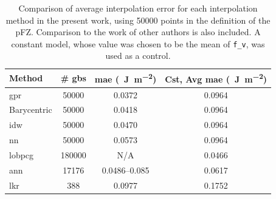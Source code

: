 \documentclass[preprint,12pt]{elsarticle}
\begin{document}
\begin{table}
\caption{Comparison of average interpolation error for each interpolation method in the present work, using \num{50000} points in the definition of the pFZ. Comparison to the work of other authors is also included. A constant model, whose value was chosen to be the mean of \texttt{f\_v}, was used as a control.}
\centering
\begin{tabular}{lccc}
\toprule
Method                                                      & \multicolumn{1}{l}{\# \glspl{gb}} & \multicolumn{1}{l}{\gls{mae} (\SI{}{\J\per\square\meter})} & \multicolumn{1}{l}{Cst, Avg \gls{mae} (\SI{}{\J\per\square\meter})} \\ \midrule
\Gls{gpr}                                                   & \num{50000}                       & \num{0.0372}                                               & \num{0.0964}                                                        \\
Barycentric                                                 & \num{50000}                       & \num{0.0418}                                               & \num{0.0964}                                                        \\
\gls{idw}                                                   & \num{50000}                       & \num{0.0470}                                               & \num{0.0964}                                                        \\
\gls{nn}                                                    & \num{50000}                       & \num{0.0573}                                               & \num{0.0964}                                                        \\
\gls{lobpcg} \cite{shenDeterminingGrainBoundary2019}        & \num{180000}                      & N/A                                                        & \num{0.0466}                                                        \\
\gls{ann} \cite{echeverrirestrepoUsingArtificialNeural2014} & \num{17176}                       & \num{0.0486}--\num{0.085}                                  & \num{0.0617}                                                        \\
\gls{lkr} \cite{chesserLearningGrainBoundary2020}           & \num{388}                         & \num{0.0977}                                               & \num{0.1752}                                                        \\ \bottomrule
\end{tabular}
\label{tab:mae-error-comparison}
\end{table}
\end{document}
